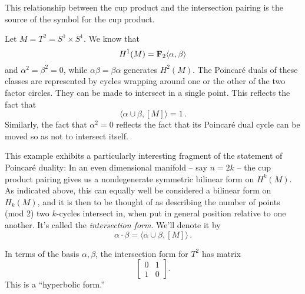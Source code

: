 This relationship between the cup product and the intersection pairing is 
the source of the symbol for the cup product.

\begin{example}
Let $M=T^2=S^1\times S^1$. We know that 
\[
H^1(M)=\mathbf F_2\langle\alpha,\beta\rangle
\]
and $\alpha^2=\beta^2=0$, while $\alpha\beta=\beta\alpha$ generates $H^2(M)$.
The Poincar\'e duals of these classes are represented by cycles wrapping 
around one or the other of the two factor circles. They can be made to 
intersect in a single point. This reflects the fact that 
\[
\langle\alpha\cup\beta,[M]\rangle=1\,.
\]
Similarly, the fact that $\alpha^2=0$ reflects the fact that its Poincar\'e 
dual cycle can be moved so as not to intersect itself. 


\end{example}

This example exhibits a particularly interesting fragment of the statement
of Poincar\'e duality: In an even dimensional manifold -- say $n=2k$ -- the
cup product pairing gives us a nondegenerate symmetric bilinear form on 
$H^k(M)$. As indicated above, this can equally well be considered a bilinear
form on $H_k(M)$, and it is then to be thought of as describing the number of
points (mod 2) two $k$-cycles intersect in, when put in general position 
relative to one another. It's called the {\em intersection form}. We'll 
denote it by
\[
\alpha\cdot\beta=\langle\alpha\cup\beta,[M]\rangle\,.
\]

\begin{example} In terms of the basis $\alpha,\beta$, the intersection form
for $T^2$ has matrix 
\[
\left[\begin{array}{cc}0&1\\1&0\end{array}\right].
\]
This is a ``hyperbolic form.'' 
\end{example}

